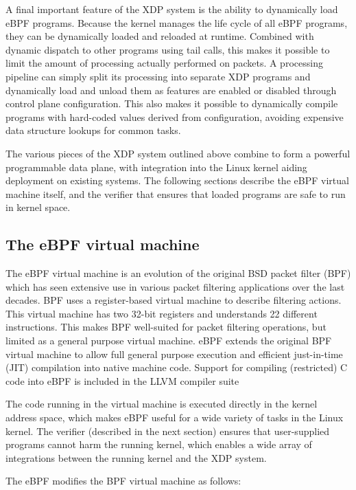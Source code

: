 \documentclass[10pt]{sig-alternate-05-2015}
\begin{document}
A final important feature of the XDP system is the ability to dynamically load
eBPF programs. Because the kernel manages the life cycle of all eBPF programs,
they can be dynamically loaded and reloaded at runtime. Combined with dynamic
dispatch to other programs using tail calls, this makes it possible to limit the
amount of processing actually performed on packets. A processing pipeline can
simply split its processing into separate XDP programs and dynamically load and
unload them as features are enabled or disabled through control plane
configuration. This also makes it possible to dynamically compile programs with
hard-coded values derived from configuration, avoiding expensive data structure
lookups for common tasks.

The various pieces of the XDP system outlined above combine to form a powerful
programmable data plane, with integration into the Linux kernel aiding
deployment on existing systems. The following sections describe the eBPF virtual
machine itself, and the verifier that ensures that loaded programs are safe to
run in kernel space.

\subsection{The eBPF virtual machine}
\label{sec:bpf-vm}
The eBPF virtual machine is an evolution of the original BSD packet filter (BPF)
\cite{mccanne_bsd_1993} which has seen extensive use in various packet filtering
applications over the last decades. BPF uses a register-based virtual machine to
describe filtering actions. This virtual machine has two 32-bit registers and
understands 22 different instructions. This makes BPF well-suited for packet
filtering operations, but limited as a general purpose virtual machine. eBPF
extends the original BPF virtual machine to allow full general purpose execution
and efficient just-in-time (JIT) compilation into native machine code. Support
for compiling (restricted) C code into eBPF is included in the LLVM compiler
suite

The code running in the virtual machine is executed directly in the kernel
address space, which makes eBPF useful for a wide variety of tasks in the Linux
kernel. The verifier (described in the next section) ensures that user-supplied
programs cannot harm the running kernel, which enables a wide array of
integrations between the running kernel and the XDP system.

The eBPF modifies the BPF virtual machine as follows:
\end{document}

